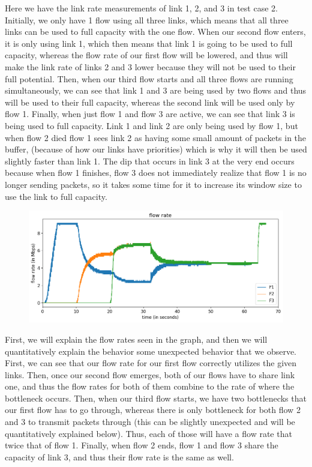 \documentclass{article}
\begin{document}
Here we have the link rate measurements of link 1, 2, and 3 in test case 2. Initially, we only have 1 flow using all three links, which means that all three links can be used to full capacity with the one flow. When our second flow enters, it is only using link 1, which then means that link 1 is going to be used to full capacity, whereas the flow rate of our first flow will be lowered, and thus will make the link rate of links 2 and 3 lower because they will not be used to their full potential. Then, when our third flow starts and all three flows are running simultaneously, we can see that link 1 and 3 are being used by two flows and thus will be used to their full capacity, whereas the second link will be used only by flow 1. Finally, when just flow 1 and flow 3 are active, we can see that link 3 is being used to full capacity. Link 1 and link 2 are only being used by flow 1, but when flow 2 died flow 1 sees link 2 as having some small amount of packets in the buffer, (because of how our links have priorities) which is why it will then be used slightly faster than link 1. The dip that occurs in link 3 at the very end occurs because when flow 1 finishes, flow 3 does not immediately realize that flow 1 is no longer sending packets, so it takes some time for it to increase its window size to use the link to full capacity.

\begin{figure}[H]
\centering
\includegraphics[width = \textwidth]{test_case2_fast flow rate.png}
\end{figure}

First, we will explain the flow rates seen in the graph, and then we will quantitatively explain the behavior some unexpected behavior that we observe. First, we can see that our flow rate for our first flow correctly utilizes the given links. Then, once our second flow emerges, both of our flows have to share link one, and thus the flow rates for both of them combine to the rate of where the bottleneck occurs. Then, when our third flow starts, we have two bottlenecks that our first flow has to go through, whereas there is only bottleneck for both flow 2 and 3 to transmit packets through (this can be slightly unexpected and will be quantitatively explained below). Thus, each of those will have a flow rate that twice that of flow 1. Finally, when flow 2 ends, flow 1 and flow 3 share the capacity of link 3, and thus their flow rate is the same as well. 
\end{document}
